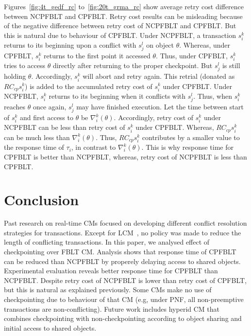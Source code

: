 \documentclass[conference]{IEEEtran}
\begin{document}
Figures~\ref{fig:4t_gedf_rc} to~\ref{fig:20t_grma_rc} show average retry cost difference between NCPFBLT and CPFBLT. Retry cost results can be misleading because of the negative difference between retry cost of NCPFBLT and CPFBLT. But this is natural due to behaviour of CPFBLT. Under NCPFBLT, a transaction $s_i^k$ returns to its beginning upon a conflict with $s_j^l$ on object $\theta$. Whereas, under CPFBLT, $s_i^k$ returns to the first point it accessed $\theta$. Thus, under CPFBLT, $s_i^k$ tries to access $\theta$ directly after returning to the proper checkpoint. But $s_j^l$ is still holding $\theta$. Accordingly, $s_i^k$ will abort and retry again. This retrial (donated as $RC_{cp}s_i^k$) is added to the accumulated retry cost of $s_i^k$ under CPFBLT. Under NCPFBLT, $s_i^k$ returns to its beginning when it conflicts with $s_j^l$. Thus, when $s_i^k$ reaches $\theta$ once again, $s_j^l$ may have finished execution. Let the time between start of $s_i^k$ and first access to $\theta$ be $\nabla_i^k(\theta)$. Accordingly, retry cost of $s_i^k$ under NCPFBLT can be less than retry cost of $s_i^k$ under CPFBLT. Whereas, $RC_{cp}s_i^k$ can be much less than $\nabla_i^k(\theta)$. Thus, $RC_{cp}s_i^k$ contributes by a smaller value to the response time of $\tau_i$, in contrast to $\nabla_i^k(\theta)$. This is why response time for CPFBLT is better than NCPFBLT, whereas, retry cost of NCPFBLT is less than CPFBLT.
\section{Conclusion}\label{sec:conclusion}

Past research on real-time CMs focused on developing different conflict resolution strategies for transactions. Except for LCM~\cite{lcmdac2012}, no policy was made to reduce the length of conflicting transactions. In this paper, we analysed effect of checkpointing over FBLT CM. Analysis shows that response time of CPFBLT can be reduced than NCPFBLT by properely delaying access to shared objects. Experimental evaluation reveals better response time for CPFBLT than NCPFBLT. Despite retry cost of NCPFBLT is lower than retry cost of CPFBLT, but this is natural as explained previously. Some CMs make no use of checkpointing due to behaviour of that CM (e.g, under PNF, all non-preemptive transactions are non-conflicting). Future work includes hyperid CM that combines checkpointing with non-checkpointing according to object sharing and initial access to shared objects.



%




\end{document}
